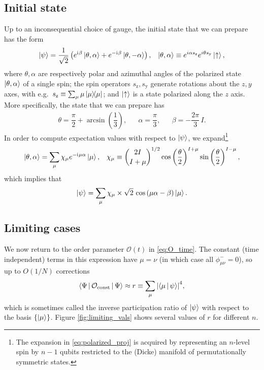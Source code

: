 \documentclass[nofootinbib,notitlepage,11pt]{revtex4-2}
\renewcommand{\t}{\text} %
\newcommand{\f}[2]{\dfrac{#1}{#2}} %
\newcommand{\p}[1]{\left(#1\right)} %
\renewcommand{\set}[1]{\left\{#1\right\}} %
\newcommand{\bk}{\Braket} %
\renewcommand{\i}{\mathrm{i}\mkern1mu} %
\newcommand{\1}{\mathds{1}}
\newcommand{\up}{\uparrow}
\newcommand{\y}{\text{y}}
\newcommand{\z}{\text{z}}
\renewcommand{\O}{\mathcal{O}}
\begin{document}
\subsection{Initial state}

Up to an inconsequential choice of gauge, the initial state that we
can prepare has the form
\begin{align}
  \ket\psi = \f1{\sqrt{2}}
  \p{e^{\i\beta} \ket{\theta,\alpha}
    + e^{-\i\beta} \ket{\theta,-\alpha}},
  &&
  \ket{\theta,\alpha} \equiv e^{i\alpha s_\z} e^{i\theta s_\y} \ket\up,
  \label{eq:double_state}
\end{align}
where $\theta,\alpha$ are respectively polar and azimuthal angles of
the polarized state $\ket{\theta,\alpha}$ of a single spin; the spin
operators $s_\z,s_\y$ generate rotations about the $z,y$ axes, with
e.g.~$s_\z\equiv\sum_\mu \mu\op\mu$; and $\ket\up$ is a state
polarized along the $z$ axis.  More specifically, the state that we
can prepare has
\begin{align}
  \theta = \f{\pi}{2} + \arcsin\p{\f13},
  &&
  \alpha = \f{\pi}{3},
  &&
  \beta = -\f{2\pi}{3}\, I.
\end{align}
In order to compute expectation values with respect to $\ket\psi$, we
expand\footnote{The expansion in \eqref{eq:polarized_proj} is acquired
  by representing an $n$-level spin by $n-1$ qubits restricted to the
  (Dicke) manifold of permutationally symmetric states.}
\begin{align}
  \ket{\theta,\alpha} = \sum_\mu \chi_\mu e^{-\i\mu\alpha} \ket\mu,
  &&
  \chi_\mu \equiv { 2I \choose I+\mu }^{1/2}
  \cos\p{\f{\theta}{2}}^{I+\mu} \sin\p{\f{\theta}{2}}^{I-\mu},
  \label{eq:polarized_proj}
\end{align}
which implies that
\begin{align}
  \ket\psi = \sum_\mu \chi_\mu \times \sqrt{2}\,
  \cos\p{\mu\alpha-\beta} \ket\mu.
\end{align}

\subsection{Limiting cases}

We now return to the order parameter $\O\p{t}$ in \eqref{eq:O_time}.
The constant (time independent) terms in this expression have
$\mu=\nu$ (in which case all $\phi_{\mu\nu}^-=0$), so up to $O(1/N)$
corrections
\begin{align}
  \bk{\Psi|\O_{\t{const}}|\Psi}
  \approx r \equiv \sum_\mu \abs{\bk{\mu|\psi}}^4,
  \label{eq:O_const}
\end{align}
which is sometimes called the inverse participation ratio of
$\ket\psi$ with respect to the basis $\set{\ket\mu}$.  Figure
\ref{fig:limiting_vals} shows several values of $r$ for different $n$.
\end{document}
